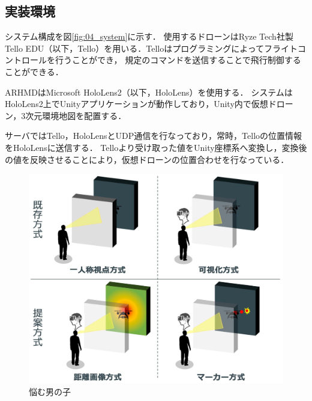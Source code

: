 \documentclass[a4paper,10pt,twocolumn,uplatex]{jsarticle}
\begin{document}
\subsection{実装環境}
システム構成を図\ref{fig:04_system}に示す．
使用するドローンはRyze Tech社製Tello EDU（以下，Tello）を用いる．Telloはプログラミングによってフライトコントロールを行うことができ，
規定のコマンドを送信することで飛行制御することができる．
\par
ARHMDはMicrosoft HoloLens2（以下，HoloLens）を使用する．
システムはHoloLens2上でUnityアプリケーションが動作しており，Unity内で仮想ドローン，3次元環境地図を配置する．
\par
サーバではTello，HoloLensとUDP通信を行なっており，常時，Telloの位置情報をHoloLensに送信する．
Telloより受け取った値をUnity座標系へ変換し，変換後の値を反映させることにより，仮想ドローンの位置合わせを行なっている．
\par



\begin{figure}[!tb]
  \centering
  \includegraphics[width=\linewidth]{img/03_outline.eps}
  \caption{悩む男の子}
  \label{fig:sample1}
\end{figure}
  
\end{document}
